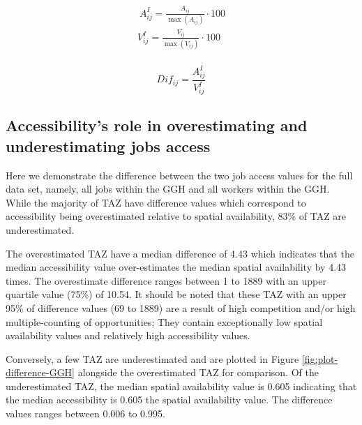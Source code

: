 \documentclass[]{elsarticle} %
\begin{document}
\begin{equation}
\label{eq:index-measures}
\begin{array}{l}\
A^I_{ij} = \frac{A_{ij}}{\max(A_{ij})}\cdot100\\
V^I_{ij} = \frac{V_{ij}}{\max(V_{ij})}\cdot100\\
\end{array}
\end{equation}

\begin{equation}
\label{eq:dif-index-measures}
Dif_{ij} = \frac{A^I_{ij}}{V^I_{ij}}
\end{equation}

\hypertarget{accessibilitys-role-in-overestimating-and-underestimating-jobs-access}{%
\subsection{Accessibility's role in overestimating and underestimating
jobs
access}\label{accessibilitys-role-in-overestimating-and-underestimating-jobs-access}}

Here we demonstrate the difference between the two job access values for
the full data set, namely, all jobs within the GGH and all workers
within the GGH. While the majority of TAZ have difference values which
correspond to accessibility being overestimated relative to spatial
availability, 83\% of TAZ are underestimated.

The overestimated TAZ have a median difference of 4.43 which indicates
that the median accessibility value over-estimates the median spatial
availability by 4.43 times. The overestimate difference ranges between 1
to 1889 with an upper quartile value (75\%) of 10.54. It should be noted
that these TAZ with an upper 95\% of difference values (69 to 1889) are
a result of high competition and/or high multiple-counting of
opportunities; They contain exceptionally low spatial availability
values and relatively high accessibility values.

Conversely, a few TAZ are underestimated and are plotted in Figure
\ref{fig:plot-difference-GGH} alongside the overestimated TAZ for
comparison. Of the underestimated TAZ, the median spatial availability
value is 0.605 indicating that the median accessibility is 0.605 the
spatial availability value. The difference values ranges between 0.006
to 0.995.
\end{document}
